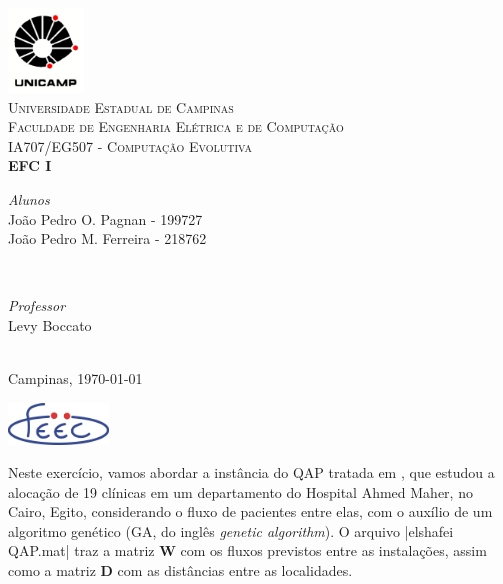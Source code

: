 \documentclass[a4paper, 12pt]{article}
\begin{document}
\begin{titlepage}
\newcommand{\HRule}{\rule{\linewidth}{0.5mm}}
	
\centering

\includegraphics[width=0.15\textwidth]{logo-unicamp.pdf}\\[0.5cm]	
\textsc{\Large Universidade Estadual de Campinas}\\[2.0cm]
\textsc{\large Faculdade de Engenharia Elétrica e de Computação}\\[0.5cm]
	
\textsc{IA707/EG507 - Computação Evolutiva}\\[2.5cm]
	
{\LARGE \bfseries EFC I}\\[3.5cm]

\begin{minipage}[t]{0.4\textwidth}
	\begin{flushleft}
    \textit{Alunos}\\
    João Pedro O. Pagnan - 199727\\
    João Pedro M. Ferreira - 218762
	\end{flushleft}
\end{minipage}
~
\begin{minipage}[t]{0.4\textwidth}
	\begin{flushright}
		\textit{Professor}\\
		Levy Boccato
	\end{flushright}
\end{minipage}\\[4.5cm]

{Campinas, \today}
	
\vfill\vfill\vfill\vfill\vfill

\includegraphics[width=0.2\textwidth]{logo-feec.png}\\[0.5cm]
\vfill 
	
\end{titlepage}

\justify

Neste exercício, vamos abordar a instância do QAP tratada em \cite{elshafei1977hospital}, que estudou a alocação de 19 clínicas em um departamento do Hospital Ahmed Maher, no Cairo, Egito, considerando o fluxo de pacientes entre elas, com o auxílio de um algoritmo genético (GA, do inglês \textit{genetic algorithm}). O arquivo \Pverb|elshafei QAP.mat| traz a matriz $\mathbf{W}$ com os fluxos previstos entre as instalações, assim como a matriz $\mathbf{D}$ com as distâncias entre as localidades.
\end{document}
